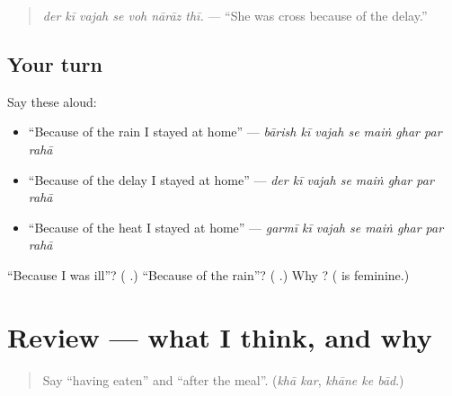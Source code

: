 \begin{quote}
\textbf{      }
\end{quote}

\begin{quote}
\emph{der kī vajah se voh nārāz thī.} — \textquotedblleft{}She was cross because of the delay.\textquotedblright{}
\end{quote}

\subsection*{Your turn}
Say these aloud:

\begin{itemize}
\raggedright
  \item \textquotedblleft{}Because of the rain I stayed at home\textquotedblright{} — \emph{bārish kī vajah se maiṅ ghar par rahā}
  \item \textquotedblleft{}Because of the delay I stayed at home\textquotedblright{} — \emph{der kī vajah se maiṅ ghar par rahā}
  \item \textquotedblleft{}Because of the heat I stayed at home\textquotedblright{} — \emph{garmī kī vajah se maiṅ ghar par rahā}
\end{itemize}

\begin{tcolorbox}[breakable,colback=teal!4,colframe=teal!35!black,title={Before you move on}]
\textquotedblleft{}Because I was ill\textquotedblright{}? (\textbf{   }.) \textquotedblleft{}Because of the rain\textquotedblright{}? (\textbf{   }.) Why \textbf{}? (\textbf{} is feminine.)
\end{tcolorbox}
\section[(review)]{Review — what I think, and why}

\label{lesson:UR-R268-opinion-and-reason}



\begin{quote}
Say \textquotedblleft{}having eaten\textquotedblright{} and \textquotedblleft{}after the meal\textquotedblright{}. (\emph{khā kar}, \emph{khāne ke bād}.)
\end{quote}

